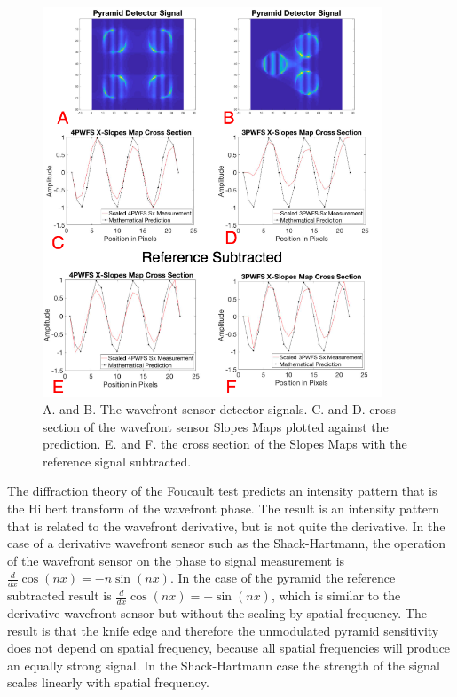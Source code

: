 \begin{figure}
    \centering
    \includegraphics[width=0.9\textwidth]{Chapter Materials/Chapter Two Materials/Mod0PredictionVsSIm.png}
    \caption{A. and B. The wavefront sensor detector signals. C. and D. cross section of the wavefront sensor Slopes Maps plotted against the prediction. E. and F. the cross section of the Slopes Maps with the reference signal subtracted.}
    \label{fig:Mod0}
\end{figure}

The diffraction theory of the Foucault test predicts an intensity pattern that is the Hilbert transform of the wavefront phase. The result is an intensity pattern that is related to the wavefront derivative, but is not quite the derivative. In the case of a derivative wavefront sensor such as the Shack-Hartmann, the operation of the wavefront sensor on the phase to signal measurement is $\frac{d}{dx}\cos(nx)=-n\sin(nx)$. In the case of the pyramid the reference subtracted result is  $\frac{d}{dx}\cos(nx)=-\sin(nx)$, which is similar to the derivative wavefront sensor but without the scaling by spatial frequency. The result is that the knife edge and therefore the unmodulated pyramid sensitivity does not depend on spatial frequency, because all spatial frequencies will produce an equally strong signal. In the Shack-Hartmann case the strength of the signal scales linearly with spatial frequency.


